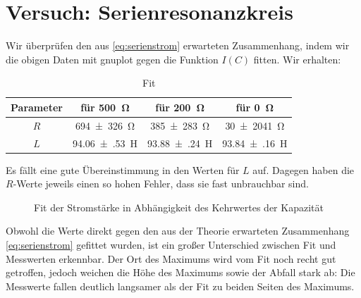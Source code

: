 \section{Versuch: Serienresonanzkreis}
Wir überprüfen den aus \cref{eq:serienstrom} erwarteten Zusammenhang, indem wir die obigen Daten mit gnuplot gegen die Funktion $I(C)$ fitten. Wir erhalten:
\begin{table}[H]
  \centering
  \begin{tabular}{c c c c} \toprule
    Parameter & für \SI{500}{\ohm} & für \SI{200}{\ohm} & für \SI{0}{\ohm} \\ \midrule
    $R$ & \SI{694(326)}{\ohm} & \SI{385(283)}{\ohm}  & \SI{30(2041)}{\ohm} \\
    $L$ & \SI{94.06(53)}{\henry} & \SI{93.88(24)}{\henry} & \SI{93.84(16)}{\henry} \\ \bottomrule 
  \end{tabular}
  \caption{Fit}
  \label{tab:serienfit}
\end{table}
Es fällt eine gute Übereinstimmung in den Werten für $L$ auf. Dagegen haben die $R$-Werte jeweils einen so hohen Fehler, dass sie fast unbrauchbar sind.
\begin{figure}[H]
\centering
{}
\caption{Fit der Stromstärke in Abhängigkeit des Kehrwertes der Kapazität}
\label{fig:serienfit}
\end{figure}
Obwohl die Werte direkt gegen den aus der Theorie erwarteten Zusammenhang \cref{eq:serienstrom} gefittet wurden, ist ein großer Unterschied zwischen Fit und Messwerten erkennbar. Der Ort des Maximums wird vom Fit noch recht gut getroffen, jedoch weichen die Höhe des Maximums sowie der Abfall stark ab: Die Messwerte fallen deutlich langsamer als der Fit zu beiden Seiten des Maximums. 
